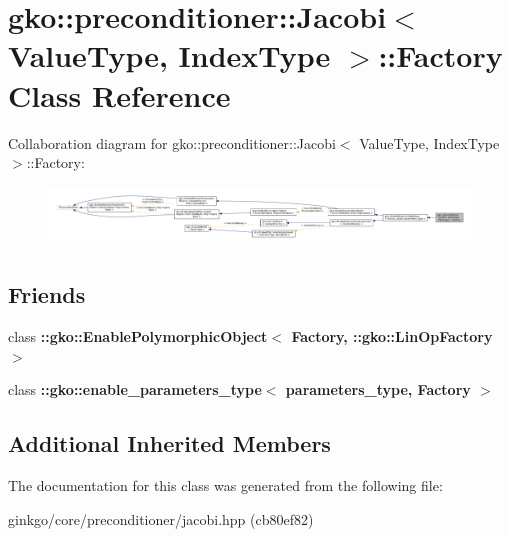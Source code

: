 \hypertarget{classgko_1_1preconditioner_1_1Jacobi_1_1Factory}{}\section{gko\+:\+:preconditioner\+:\+:Jacobi$<$ Value\+Type, Index\+Type $>$\+:\+:Factory Class Reference}
\label{classgko_1_1preconditioner_1_1Jacobi_1_1Factory}


Collaboration diagram for gko\+:\+:preconditioner\+:\+:Jacobi$<$ Value\+Type, Index\+Type $>$\+:\+:Factory\+:
\nopagebreak
\begin{figure}[H]
\begin{center}
\leavevmode
\includegraphics[width=350pt]{classgko_1_1preconditioner_1_1Jacobi_1_1Factory__coll__graph}
\end{center}
\end{figure}
\subsection*{Friends}
\begin{DoxyCompactItemize}
\item 
\mbox{\label{classgko_1_1preconditioner_1_1Jacobi_1_1Factory_a27e9bbc94a1c1c59f40833153eda8f78}} 
class {\bfseries \+::gko\+::\+Enable\+Polymorphic\+Object$<$ Factory, \+::gko\+::\+Lin\+Op\+Factory $>$}
\item 
\mbox{\label{classgko_1_1preconditioner_1_1Jacobi_1_1Factory_a0d176cbd42d6214e11aee8c30ca256fc}} 
class {\bfseries \+::gko\+::enable\+\_\+parameters\+\_\+type$<$ parameters\+\_\+type, Factory $>$}
\end{DoxyCompactItemize}
\subsection*{Additional Inherited Members}


The documentation for this class was generated from the following file\+:\begin{DoxyCompactItemize}
\item 
ginkgo/core/preconditioner/jacobi.\+hpp (cb80ef82)\end{DoxyCompactItemize}
